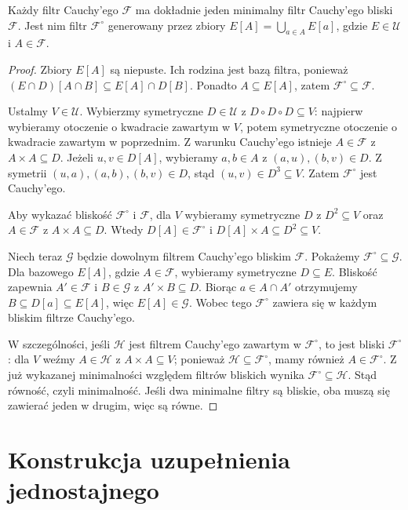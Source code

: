 \begin{lemat}
\label{lem:topog-uzupelnienia-minimalizacja}
Każdy filtr Cauchy'ego $\mathcal F$ ma
dokładnie jeden minimalny filtr Cauchy'ego
bliski $\mathcal F$. Jest nim filtr
$\mathcal F^\circ$ generowany przez zbiory
$E[A]=\bigcup_{a\in A}E[a]$, gdzie
$E\in\mathcal U$ i $A\in\mathcal F$.
\end{lemat}
\begin{proof}
Zbiory $E[A]$ są niepuste. Ich rodzina
jest bazą filtra, ponieważ
$(E\cap D)[A\cap B]\subseteq E[A]\cap D[B]$.
Ponadto $A\subseteq E[A]$, zatem
$\mathcal F^\circ\subseteq\mathcal F$.

Ustalmy $V\in\mathcal U$. Wybierzmy
symetryczne $D\in\mathcal U$ z
$D\circ D\circ D\subseteq V$:
najpierw wybieramy otoczenie o kwadracie
zawartym w $V$, potem symetryczne otoczenie
o kwadracie zawartym w poprzednim.
Z warunku Cauchy'ego istnieje
$A\in\mathcal F$ z $A\times A\subseteq D$.
Jeżeli $u,v\in D[A]$, wybieramy
$a,b\in A$ z $(a,u),(b,v)\in D$.
Z symetrii $(u,a),(a,b),(b,v)\in D$,
stąd $(u,v)\in D^3\subseteq V$.
Zatem $\mathcal F^\circ$ jest Cauchy'ego.

Aby wykazać bliskość $\mathcal F^\circ$
i $\mathcal F$, dla $V$ wybieramy
symetryczne $D$ z $D^2\subseteq V$
oraz $A\in\mathcal F$ z $A\times A\subseteq D$.
Wtedy $D[A]\in\mathcal F^\circ$
i $D[A]\times A\subseteq D^2\subseteq V$.

Niech teraz $\mathcal G$ będzie dowolnym
filtrem Cauchy'ego bliskim $\mathcal F$.
Pokażemy $\mathcal F^\circ\subseteq\mathcal G$.
Dla bazowego $E[A]$, gdzie
$A\in\mathcal F$, wybieramy symetryczne
$D\subseteq E$. Bliskość zapewnia
$A'\in\mathcal F$ i $B\in\mathcal G$
z $A'\times B\subseteq D$.
Biorąc $a\in A\cap A'$ otrzymujemy
$B\subseteq D[a]\subseteq E[A]$,
więc $E[A]\in\mathcal G$.
Wobec tego $\mathcal F^\circ$
zawiera się w każdym bliskim filtrze Cauchy'ego.

W szczególności, jeśli $\mathcal H$
jest filtrem Cauchy'ego zawartym w
$\mathcal F^\circ$, to jest bliski
$\mathcal F^\circ$: dla $V$ weźmy
$A\in\mathcal H$ z $A\times A\subseteq V$;
ponieważ $\mathcal H\subseteq\mathcal F^\circ$,
mamy również $A\in\mathcal F^\circ$.
Z już wykazanej minimalności względem
filtrów bliskich wynika
$\mathcal F^\circ\subseteq\mathcal H$.
Stąd równość, czyli minimalność.
Jeśli dwa minimalne filtry są bliskie,
oba muszą się zawierać jeden w drugim,
więc są równe.
\end{proof}

\section{Konstrukcja uzupełnienia jednostajnego}
\label{sec:topog-uzupelnienia-konstrukcja}


